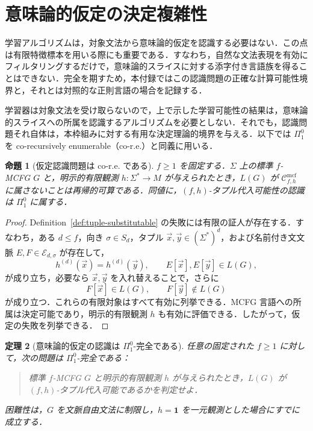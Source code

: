 \documentclass[11pt,a4paper]{ltjsarticle}
\numberwithin{equation}{section}
\theoremstyle{plain}
\newtheorem{theorem}{定理}[section]
\newtheorem{proposition}[theorem]{命題}
\theoremstyle{definition}
\theoremstyle{remark}
\newcommand{\Cmcf}[2]{\mathcal{C}^{\mathrm{mcf}}_{#1,#2}}
\newcommand{\tuple}[1]{\vec{#1}}
\begin{document}

\section{意味論的仮定の決定複雑性}
\label{app:decision-complexity}

学習アルゴリズムは，対象文法から意味論的仮定を認識する必要はない．この点は有限特徴標本を用いる際にも重要である．すなわち，自然な文法表現を有効にフィルタリングするだけで，意味論的スライスに対する添字付き言語族を得ることはできない．完全を期すため，本付録ではこの認識問題の正確な計算可能性境界と，それとは対照的な正則言語の場合を記録する．

学習器は対象文法を受け取らないので，上で示した学習可能性の結果は，意味論的スライスへの所属を認識するアルゴリズムを必要としない．それでも，認識問題それ自体は，本枠組みに対する有用な決定理論的境界を与える．以下では $\Pi^0_1$ を co-recursively enumerable（co-r.e.）と同義に用いる．

\begin{proposition}[仮定認識問題は co-r.e. である]
\label{prop:promise-pi1-upper}
$f\ge1$ を固定する．$\Sigma$ 上の標準 $f$-MCFG $G$ と，明示的有限観測 $h:\Sigma^*\to M$ が与えられたとき，$L(G)$ が $\Cmcf{f}{h}$ に属さないことは再帰的可算である．同値に，$(f,h)$-タプル代入可能性の認識は $\Pi^0_1$ に属する．
\end{proposition}

\begin{proof}
Definition~\ref{def:tuple-substitutable} の失敗には有限の証人が存在する．すなわち，ある $d\le f$，向き $\sigma\in S_d$，タプル
$\tuple x,\tuple y\in(\Sigma^*)^d$，および名前付き文文脈
$E,F\in\mathcal E_{d,\sigma}$ が存在して，
\[
 h^{(d)}(\tuple x)=h^{(d)}(\tuple y),
 \qquad
 E[\tuple x],E[\tuple y]\in L(G),
\]
が成り立ち，必要なら $\tuple x,\tuple y$ を入れ替えることで，さらに
\[
 F[\tuple x]\in L(G),
 \qquad
 F[\tuple y]\notin L(G)
\]
が成り立つ．これらの有限対象はすべて有効に列挙できる．MCFG 言語への所属は決定可能であり，明示的有限観測 $h$ も有効に評価できる．したがって，仮定の失敗を列挙できる．
\end{proof}

\begin{theorem}[意味論的仮定の認識は $\Pi^0_1$-完全である]
\label{thm:promise-pi1-complete}
任意の固定された $f\ge1$ に対して，次の問題は $\Pi^0_1$-完全である：
\begin{quote}
標準 $f$-MCFG $G$ と明示的有限観測 $h$ が与えられたとき，$L(G)$ が $(f,h)$-タプル代入可能であるかを判定せよ．
\end{quote}
困難性は，$G$ を文脈自由文法に制限し，$h=\mathbf 1$ を一元観測とした場合にすでに成立する．
\end{theorem}
\end{document}

